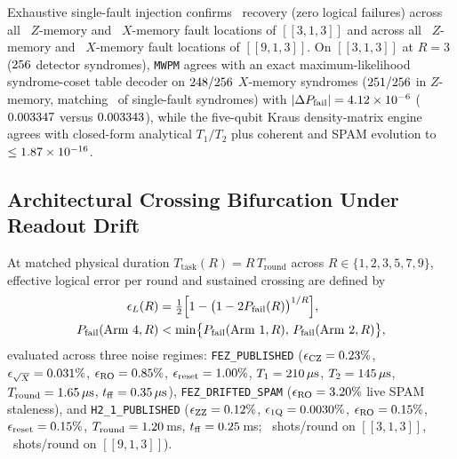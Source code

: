\documentclass[aps,prx,twocolumn,superscriptaddress,nofootinbib]{revtex4-2}
\begin{document}
Exhaustive single-fault injection confirms \ecqSingleFaultRecoveryPct\ recovery (zero logical failures) across all \ecqSingleFaultLocRepZ\ $Z$-memory and \ecqSingleFaultLocRepX\ $X$-memory fault locations of $[[3,1,3]]$ and across all \ecqSingleFaultLocSurfZ\ $Z$-memory and \ecqSingleFaultLocSurfX\ $X$-memory fault locations of $[[9,1,3]]$. On $[[3,1,3]]$ at $R = 3$ ($256$ detector syndromes), \texttt{MWPM} agrees with an exact maximum-likelihood syndrome-coset table decoder on $248 / 256$ $X$-memory syndromes ($251 / 256$ in $Z$-memory, matching \ecqSingleFaultRecoveryPct\ of single-fault syndromes) with $|\Delta P_{\mathrm{fail}}| = 4.12 \times 10^{-6}$ ($0.003347$ versus $0.003343$), while the five-qubit Kraus density-matrix engine agrees with closed-form analytical $T_1/T_2$ plus coherent and SPAM evolution to $\le 1.87 \times 10^{-16}$.

\subsection{Architectural Crossing Bifurcation Under Readout Drift}
At matched physical duration $T_{\mathrm{task}}(R) = R\,T_{\mathrm{round}}$ across $R \in \{1,2,3,5,7,9\}$, effective logical error per round and sustained crossing are defined by
\begin{align}
  \epsilon_L(R) &= \tfrac{1}{2}\Bigl[1 - \bigl(1 - 2 P_{\mathrm{fail}}(R)\bigr)^{1/R}\Bigr], \nonumber\\
  P_{\mathrm{fail}}(\mathrm{Arm\ 4}, R) &< \min\bigl\{P_{\mathrm{fail}}(\mathrm{Arm\ 1}, R),\, P_{\mathrm{fail}}(\mathrm{Arm\ 2}, R)\bigr\},
  \label{eq:eps_l_crossing}
\end{align}
evaluated across three noise regimes: \texttt{FEZ\_PUBLISHED} ($\epsilon_{\mathrm{CZ}} = 0.23\%$, $\epsilon_{\sqrt{X}} = 0.031\%$, $\epsilon_{\mathrm{RO}} = 0.85\%$, $\epsilon_{\mathrm{reset}} = 1.00\%$, $T_1 = 210\,\mu\mathrm{s}$, $T_2 = 145\,\mu\mathrm{s}$, $T_{\mathrm{round}} = 1.65\,\mu\mathrm{s}$, $t_{\mathrm{ff}} = 0.35\,\mu\mathrm{s}$), \texttt{FEZ\_DRIFTED\_SPAM} ($\epsilon_{\mathrm{RO}} = 3.20\%$ live SPAM staleness), and \texttt{H2\_1\_PUBLISHED} ($\epsilon_{\mathrm{ZZ}} = 0.12\%$, $\epsilon_{\mathrm{1Q}} = 0.0030\%$, $\epsilon_{\mathrm{RO}} = 0.15\%$, $\epsilon_{\mathrm{reset}} = 0.15\%$, $T_{\mathrm{round}} = 1.20$\,ms, $t_{\mathrm{ff}} = 0.25$\,ms; \ecqRepShots\ shots/round on $[[3,1,3]]$, \ecqSurfShots\ shots/round on $[[9,1,3]]$).
\end{document}
